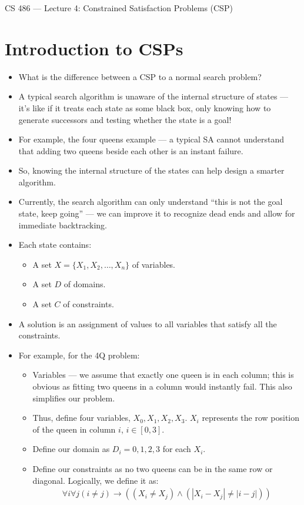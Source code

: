 \documentclass{article}
\author{Clement Tsang}
\begin{document}
\begin{center}
    \Large{CS 486 --- Lecture 4: Constrained Satisfaction Problems (CSP)}
\end{center}

\section{Introduction to CSPs}
\begin{itemize}
    \item What is the difference between a CSP to a normal search problem?
    \item A typical search algorithm is unaware of the internal structure of states --- it's like if it treats each state as some black box, only knowing how to generate successors and testing whether the state is a goal!
    \item For example, the four queens example --- a typical SA cannot understand that adding two queens beside each other is an instant failure.
    \item So, knowing the internal structure of the states can help design a smarter algorithm.
    \item Currently, the search algorithm can only understand ``this is not the goal state, keep going'' --- we can improve it to recognize dead ends and allow for immediate backtracking.
    \item Each state contains:
        \begin{itemize}
            \item A set $X = \{X_1, X_2, \dots, X_n\}$ of variables.
            \item A set $D$ of domains.
            \item A set $C$ of constraints.
        \end{itemize}
    \item A solution is an assignment of values to all variables that satisfy all the constraints.
    \item For example, for the 4Q problem:
        \begin{itemize}
            \item Variables --- we assume that exactly one queen is in each column; this is obvious as fitting two queens in a column would instantly fail.  This also simplifies our problem.
            \item Thus, define four variables, $X_0, X_1, X_2, X_3$.  $X_i$ represents the row position of the queen in column $i$, $i \in [0, 3]$.
            \item Define our domain as $D_i = {0, 1, 2, 3}$ for each $X_i$.
            \item Define our constraints as no two queens can be in the same row or diagonal.  Logically, we define it as:
                \begin{align*}
                \forall i \forall j (i \neq j) \rightarrow (
                    (X_i \neq X_j) \wedge 
                    (|X_i - X_j| \neq |i - j|)
                )
                \end{align*}
        \end{itemize}
\end{itemize}
\end{document}

